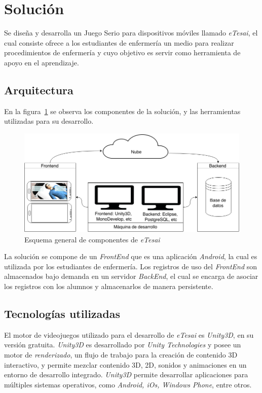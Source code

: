 
\section{Solución}

Se diseña y desarrolla un Juego Serio para dispositivos móviles llamado
\textit{eTesai}, el cual consiste ofrece a los  estudiantes de enfermería un
medio para realizar procedimientos de enfermería y cuyo objetivo es servir como
herramienta de apoyo en el aprendizaje.

\subsection{Arquitectura}

En la figura~\ref{fig:full_architecture} se observa los componentes de la
solución, y las herramientas utilizadas para su desarrollo.

\begin{figure}[H]
\centering
\includegraphics[scale=0.29]{images/full.png}
\caption{Esquema general de componentes de \textit{eTesai}}
\label{fig:full_architecture}
\end{figure}

La solución se compone de un \textit{FrontEnd} que es una aplicación
\textit{Android}, la cual es utilizada por los estudiantes de enfermería. Los
registros de uso del \textit{FrontEnd} son almacenados bajo demanda en un
servidor \textit{BackEnd}, el cual se encarga de asociar los registros con los
alumnos y almacenarlos de manera persistente.


\subsection{Tecnologías utilizadas}

El motor de videojuegos utilizado para el desarrollo de \textit{eTesai} es
\textit{Unity3D}, en su versión gratuita. \textit{Unity3D} es desarrollado por
\textit{Unity Technologies} y posee un motor de \textit{renderizado}, un flujo
de trabajo para la creación de contenido 3D interactivo, y permite mezclar
contenido 3D, 2D, sonidos y animaciones en un entorno de desarrollo integrado.
\textit{Unity3D} permite desarrollar aplicaciones para múltiples sistemas
operativos, como \textit{Android, iOs, Windows Phone}, entre
otros\cite{unity3d}.


